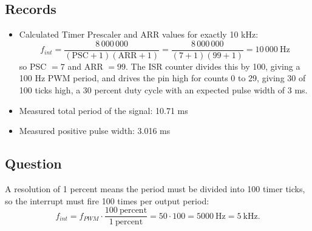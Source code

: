 \documentclass[11pt]{article}
\begin{document}
\subsection{Records}
\begin{itemize}
    \item Calculated Timer Prescaler and ARR values for exactly 10 kHz:
    \[
        f_{int} = \frac{8\,000\,000}{(\text{PSC}+1)(\text{ARR}+1)} = \frac{8\,000\,000}{(7+1)(99+1)} = 10\,000~\text{Hz}
    \]
    so PSC $= 7$ and ARR $= 99$. The ISR counter divides this by 100, giving a 100 Hz PWM period, and drives the pin high for counts 0 to 29, giving 30 of 100 ticks high, a 30 percent duty cycle with an expected pulse width of 3 ms.
    \item Measured total period of the signal: 10.71 ms
    \item Measured positive pulse width: 3.016 ms
\end{itemize}

\subsection{Question}
A resolution of 1 percent means the period must be divided into 100 timer ticks, so the interrupt must fire 100 times per output period:
\[
    f_{int} = f_{PWM} \cdot \frac{100~\text{percent}}{1~\text{percent}} = 50 \cdot 100 = 5000~\text{Hz} = 5~\text{kHz}.
\]
\end{document}
